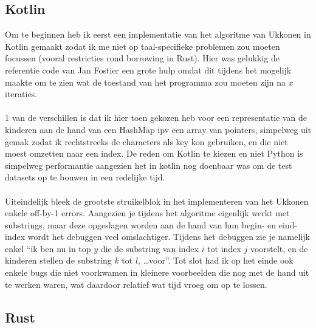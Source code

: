 \subsection{Kotlin}\label{subsec:kotlin}
Om te beginnen heb ik eerst een implementatie van het algoritme van Ukkonen in Kotlin gemaakt zodat ik me niet op taal-specifieke problemen zou moeten focussen (vooral restricties rond borrowing in Rust).
Hier was gelukkig de referentie code van Jan Fostier een grote hulp omdat dit tijdens het mogelijk maakte om te zien wat de toestand van het programma zou moeten zijn na $x$ iteraties.
\\ \\
1 van de verschillen is dat ik hier toen gekozen heb voor een representatie van de kinderen aan de hand van een HashMap ipv een array van pointers, simpelweg uit gemak zodat ik rechtstreeks de characters als key kon gebruiken, en die niet moest omzetten naar een index.
De reden om Kotlin te kiezen en niet Python is simpelweg performantie aangezien het in kotlin nog doenbaar was om de test datasets op te bouwen in een redelijke tijd.
\\ \\
Uiteindelijk bleek de grootste struikelblok in het implementeren van het Ukkonen enkele off-by-1 errors.
Aangezien je tijdens het algoritme eigenlijk werkt met substrings, maar deze opgeslagen worden aan de hand van hun begin- en eind-index wordt het debuggen veel omslachtiger.
Tijdens het debuggen zie je namelijk enkel ``ik ben nu in top $y$ die de substring van index $i$ tot index $j$ voorstelt, en de kinderen stellen de substring $k$ tot $l$, \ldots voor''.
Tot slot had ik op het einde ook enkele bugs die niet voorkwamen in kleinere voorbeelden die nog met de hand uit te werken waren, wat daardoor relatief wat tijd vroeg om op te lossen.

\subsection{Rust}\label{subsec:rust}

